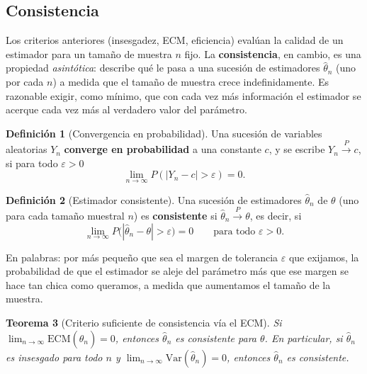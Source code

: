 \documentclass[11pt,a4paper]{article}
\theoremstyle{plain}
\newtheorem{teorema}{Teorema}[section]
\theoremstyle{definition}
\newtheorem{definicion}[teorema]{Definición}
\theoremstyle{remark}
\begin{document}
\subsection{Consistencia}

Los criterios anteriores (insesgadez, ECM, eficiencia) evalúan la calidad de un estimador para un tamaño de muestra $n$ fijo. La \textbf{consistencia}, en cambio, es una propiedad \emph{asintótica}: describe qué le pasa a una sucesión de estimadores $\widehat\theta_n$ (uno por cada $n$) a medida que el tamaño de muestra crece indefinidamente. Es razonable exigir, como mínimo, que con cada vez más información el estimador se acerque cada vez más al verdadero valor del parámetro.

\begin{definicion}[Convergencia en probabilidad]
Una sucesión de variables aleatorias $Y_n$ \textbf{converge en probabilidad} a una constante $c$, y se escribe $Y_n \xrightarrow{P} c$, si para todo $\varepsilon>0$
\[
\lim_{n\to\infty} P(|Y_n-c|>\varepsilon) = 0.
\]
\end{definicion}

\begin{definicion}[Estimador consistente]
Una sucesión de estimadores $\widehat\theta_n$ de $\theta$ (uno para cada tamaño muestral $n$) es \textbf{consistente} si $\widehat\theta_n \xrightarrow{P}\theta$, es decir, si
\[
\lim_{n\to\infty} P\big(|\widehat\theta_n-\theta|>\varepsilon\big) = 0 \qquad \text{para todo } \varepsilon>0.
\]
\end{definicion}

En palabras: por más pequeño que sea el margen de tolerancia $\varepsilon$ que exijamos, la probabilidad de que el estimador se aleje del parámetro más que ese margen se hace tan chica como queramos, a medida que aumentamos el tamaño de la muestra.

\begin{teorema}[Criterio suficiente de consistencia vía el ECM]\label{teo:consistencia}
Si $\lim_{n\to\infty}\mathrm{ECM}(\widehat\theta_n)=0$, entonces $\widehat\theta_n$ es consistente para $\theta$. En particular, si $\widehat\theta_n$ es insesgado para todo $n$ y $\lim_{n\to\infty}\mathrm{Var}(\widehat\theta_n)=0$, entonces $\widehat\theta_n$ es consistente.
\end{teorema}
\end{document}
